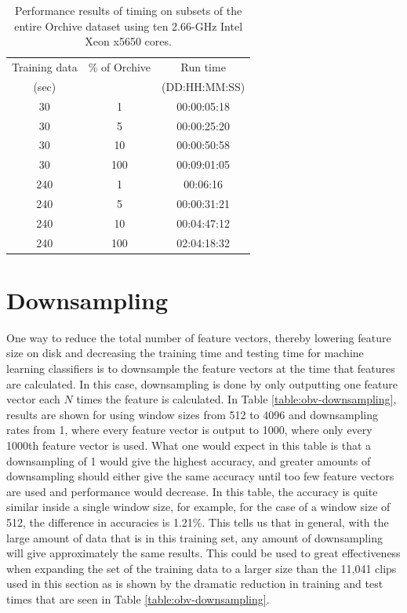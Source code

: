 \documentclass[12pt,oneside]{book}
\begin{document}
\begin{table}
\centering
\begin{tabular}{|c|c|c|} 
\hline
Training data & \% of Orchive & Run time \\
\hhline{|~|~|~|}
 (sec)        &               & (DD:HH:MM:SS) \\
\hhline{|=|=|=|}
30            &      1      &    00:00:05:18      	 \\
30            &      5      &    00:00:25:20         \\
30            &      10     &    00:00:50:58         \\
30            &      100    &    00:09:01:05         \\
\hline
240           &      1      &    00:06:16            \\
240           &      5      &    00:00:31:21         \\
240           &      10     &    00:04:47:12         \\
240           &      100    &    02:04:18:32         \\
\hline
\end{tabular}
\caption{Performance results of timing on subsets of the entire
  Orchive dataset using ten 2.66-GHz Intel Xeon x5650 cores.}
\label{table:full-orchive-performance}
\end{table}

%
%
\section{Downsampling}

One way to reduce the total number of feature vectors, thereby
lowering feature size on disk and decreasing the training time and
testing time for machine learning classifiers is to downsample the
feature vectors at the time that features are calculated.  In this
case, downsampling is done by only outputting one feature vector each
$N$ times the feature is calculated.  In Table
\ref{table:obv-downsampling}, results are shown for using window sizes
from 512 to 4096 and downsampling rates from 1, where every feature
vector is output to 1000, where only every 1000th feature vector is
used.  What one would expect in this table is that a downsampling of 1
would give the highest accuracy, and greater amounts of downsampling
should either give the same accuracy until too few feature vectors are
used and performance would decrease.  In this table, the accuracy is
quite similar inside a single window size, for example, for the case
of a window size of 512, the difference in accuracies is 1.21\%.  This
tells us that in general, with the large amount of data that is in
this training set, any amount of downsampling will give approximately
the same results.  This could be used to great effectiveness when
expanding the set of the training data to a larger size than the
11,041 clips used in this section as is shown by the dramatic
reduction in training and test times that are seen in Table
\ref{table:obv-downsampling}.
\end{document}
